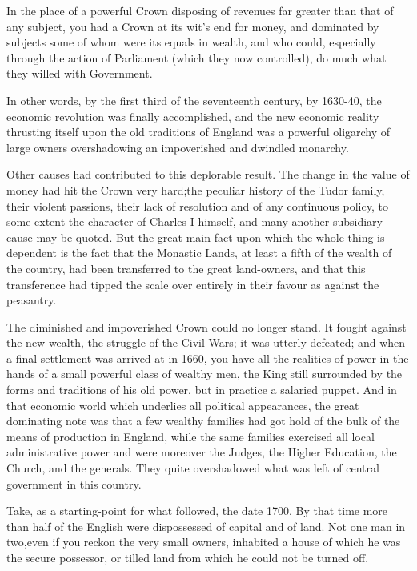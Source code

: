 \documentclass{book}
\begin{document}
In the place of a powerful Crown disposing of revenues far greater than that of any subject, you had a Crown at its wit’s end for money, and dominated by subjects some of whom were its equals in wealth, and who could, especially through the action of Parliament (which they now controlled), do much what they willed with Government.

In other words, by the first third of the seventeenth century, by 1630-40, the economic revolution was finally accomplished, and the new economic reality thrusting itself upon the old traditions of England was a powerful oligarchy of large owners overshadowing an impoverished and dwindled monarchy.

Other causes had contributed to this deplorable result. The change in the value of money had hit the Crown very hard;\footnotemark[1] the peculiar history of the Tudor family, their violent passions, their lack of resolution and of any continuous policy, to some extent the character of Charles I himself, and many another subsidiary cause may be quoted. But the great main fact upon which the whole thing is dependent is the fact that the Monastic Lands, at least a fifth of the wealth of the country, had been transferred to the great land-owners, and that this transference had tipped the scale over entirely in their favour as against the peasantry.

The diminished and impoverished Crown could no longer stand. It fought against the new wealth, the struggle of the Civil Wars; it was utterly defeated; and when a final settlement was arrived at in 1660, you have all the realities of power in the hands of a small powerful class of wealthy men, the King still surrounded by the forms and traditions of his old power, but in practice a salaried puppet. And in that economic world which underlies all political appearances, the great dominating note was that a few wealthy families had got hold of the bulk of the means of production in England, while the same families exercised all local administrative power and were moreover the Judges, the Higher Education, the Church, and the generals. They quite overshadowed what was left of central government in this country.

Take, as a starting-point for what followed, the date 1700. By that time more than half of the English were dispossessed of capital and of land. Not one man in two,even if you reckon the very small owners, inhabited a house of which he was the secure possessor, or tilled land from which he could not be turned off.
\end{document}
